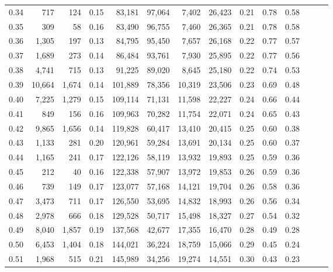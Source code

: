 \begin{tabular}{rrrrrrrrrrrrrr}
0.34 &     717 &    124 &  0.15 &   83,181 &   97,064 &   7,402 &  26,423 &  0.21 &  0.78 &      0.58 \\
0.35 &     309 &     58 &  0.16 &   83,490 &   96,755 &   7,460 &  26,365 &  0.21 &  0.78 &      0.58 \\
0.36 &   1,305 &    197 &  0.13 &   84,795 &   95,450 &   7,657 &  26,168 &  0.22 &  0.77 &      0.57 \\
0.37 &   1,689 &    273 &  0.14 &   86,484 &   93,761 &   7,930 &  25,895 &  0.22 &  0.77 &      0.56 \\
0.38 &   4,741 &    715 &  0.13 &   91,225 &   89,020 &   8,645 &  25,180 &  0.22 &  0.74 &      0.53 \\
0.39 &  10,664 &  1,674 &  0.14 &  101,889 &   78,356 &  10,319 &  23,506 &  0.23 &  0.69 &      0.48 \\
0.40 &   7,225 &  1,279 &  0.15 &  109,114 &   71,131 &  11,598 &  22,227 &  0.24 &  0.66 &      0.44 \\
0.41 &     849 &    156 &  0.16 &  109,963 &   70,282 &  11,754 &  22,071 &  0.24 &  0.65 &      0.43 \\
0.42 &   9,865 &  1,656 &  0.14 &  119,828 &   60,417 &  13,410 &  20,415 &  0.25 &  0.60 &      0.38 \\
0.43 &   1,133 &    281 &  0.20 &  120,961 &   59,284 &  13,691 &  20,134 &  0.25 &  0.60 &      0.37 \\
0.44 &   1,165 &    241 &  0.17 &  122,126 &   58,119 &  13,932 &  19,893 &  0.25 &  0.59 &      0.36 \\
0.45 &     212 &     40 &  0.16 &  122,338 &   57,907 &  13,972 &  19,853 &  0.26 &  0.59 &      0.36 \\
0.46 &     739 &    149 &  0.17 &  123,077 &   57,168 &  14,121 &  19,704 &  0.26 &  0.58 &      0.36 \\
0.47 &   3,473 &    711 &  0.17 &  126,550 &   53,695 &  14,832 &  18,993 &  0.26 &  0.56 &      0.34 \\
0.48 &   2,978 &    666 &  0.18 &  129,528 &   50,717 &  15,498 &  18,327 &  0.27 &  0.54 &      0.32 \\
0.49 &   8,040 &  1,857 &  0.19 &  137,568 &   42,677 &  17,355 &  16,470 &  0.28 &  0.49 &      0.28 \\
0.50 &   6,453 &  1,404 &  0.18 &  144,021 &   36,224 &  18,759 &  15,066 &  0.29 &  0.45 &      0.24 \\
0.51 &   1,968 &    515 &  0.21 &  145,989 &   34,256 &  19,274 &  14,551 &  0.30 &  0.43 &      0.23 \\

\end{tabular}
